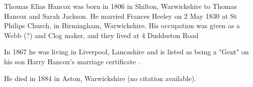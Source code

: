 
Thomas Elias Hancox was born in 1806 in Shilton, Warwickshire \cite{TEHancoxBirth} to Thomas Hancox and Sarah Jackson.
He married Frances Heeley on 2  May 1830 	at St Philips Church, in Birmingham, Warwickshire.  His occupation was given as a Webb (?) and Clog maker, and they lived at 4 Duddeston Road \cite{TEHancoxOccupation}

In 1867 he was living in Liverpool, Lancashire and is listed as being a "Gent" on his son Harry Hancox's marriage certificate \cite{TEHancox1867}.

He died in 1884 in Aston, Warwickshire (no citation available).
